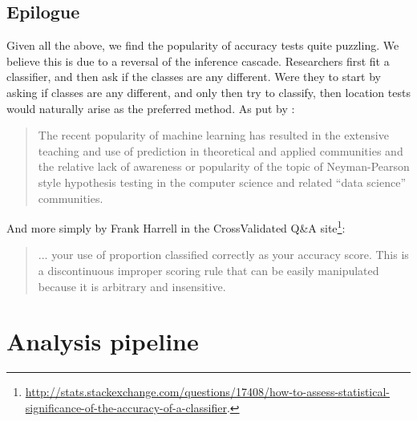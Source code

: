 \documentclass[12pt,a4paper]{article}
\begin{document}
\subsection{Epilogue}
Given all the above, we find the popularity of accuracy tests quite puzzling. 
We believe this is due to a reversal of the inference cascade. 
Researchers first fit a classifier, and then ask if the classes are any different.
Were they to start by asking if classes are any different, and only then try to classify, then location tests would naturally arise as the preferred method. 
As put by \cite{ramdas_classification_2016}:
\begin{quote}
The recent popularity of machine learning has resulted in the extensive teaching and use
of prediction in theoretical and applied communities and the relative lack of awareness or
popularity of the topic of Neyman-Pearson style hypothesis testing in the computer science
and related ``data science'' communities.
\end{quote}
And more simply by Frank Harrell in the \textsf{CrossValidated} Q\&A site\footnote{\url{http://stats.stackexchange.com/questions/17408/how-to-assess-statistical-significance-of-the-accuracy-of-a-classifier}.}:
\begin{quote}
 ... your use of proportion classified correctly as your accuracy score. This is a discontinuous improper scoring rule that can be easily manipulated because it is arbitrary and insensitive.
\end{quote}

















\newpage



\appendix


\newpage

\section{Analysis pipeline}
\label{apx:analysis}
\end{document}
